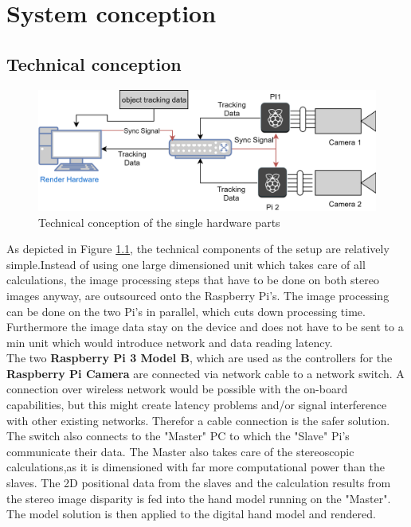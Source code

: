\chapter{System conception}\section{Technical conception}
\begin{figure}[H]
\includegraphics[width=\textwidth]{images/Technical_Workflow.png}
\caption{Technical conception of the single hardware parts}
\label{fig:technical-copnception}
\end{figure} 
As depicted in Figure \ref{fig:technical-copnception}, the technical components of the setup are relatively simple.Instead of using one large dimensioned unit which takes care of all calculations, the image processing steps that have to be done on both stereo images anyway, are outsourced onto the Raspberry Pi's.
The image processing can be done on the two Pi's in parallel, which cuts down processing time. Furthermore the image data stay on the device and does not have to be sent to a min unit which would introduce network and data reading latency.\\
The two \textbf{Raspberry Pi 3 Model B}, which are used as the controllers for the \textbf{Raspberry Pi Camera} are connected via network cable to a network switch. A connection over wireless network would be possible with the on-board capabilities, but this might create latency problems and/or signal interference with other existing networks. Therefor a cable connection is the safer solution.
The switch also connects to the "Master" PC to which the "Slave" Pi's communicate their data. The Master also takes care of the stereoscopic calculations,as it is dimensioned with far more computational power than the slaves. The 2D positional data from the slaves and the calculation results from the stereo image disparity is fed into the hand model running on the "Master". The model solution is then applied to the digital hand model and rendered.
\newpage
